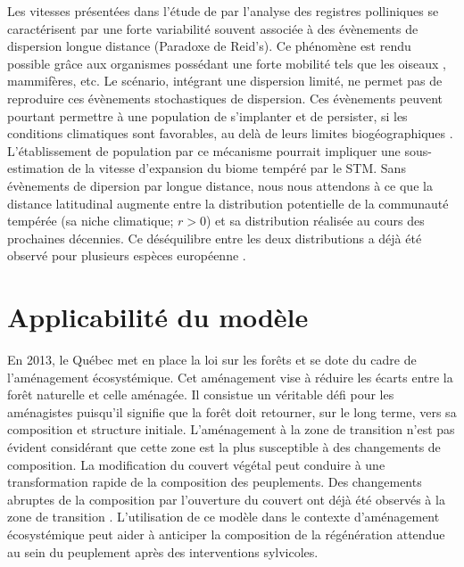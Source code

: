 Les vitesses présentées dans l'étude de \citet{Davis1981} par l'analyse des registres polliniques se
caractérisent par une forte variabilité souvent associée à des évènements de dispersion longue
distance (Paradoxe de Reid's). Ce phénomène est rendu possible grâce aux organismes possédant une
forte mobilité tels que les oiseaux \citep{Clark1998}, mammifères, etc. Le scénario, intégrant une
dispersion limité, ne permet pas de reproduire ces évènements stochastiques de dispersion. Ces
évènements peuvent pourtant permettre à une population de s'implanter et de persister, si les
conditions climatiques sont favorables, au delà de leurs limites biogéographiques
\citep{Clark1998,Corlett2013}. L'établissement de population par ce mécanisme pourrait impliquer une
sous-estimation de la vitesse d'expansion du biome tempéré par le STM.  Sans évènements de dipersion
par longue distance, nous nous attendons à ce que la distance latitudinal augmente entre la
distribution potentielle de la communauté tempérée (sa niche climatique; $r>0$) et sa distribution
réalisée au cours des prochaines décennies. Ce déséquilibre entre les deux distributions a déjà été
observé pour plusieurs espèces européenne \citep{Svenning2004}.

\section*{Applicabilité du modèle}

En 2013, le Québec met en place la loi sur les forêts et se dote du cadre de l'aménagement
écosystémique. Cet aménagement vise à réduire les écarts entre la forêt naturelle et celle aménagée.
Il consistue un véritable défi pour les aménagistes puisqu'il signifie que la forêt doit retourner,
sur le long terme, vers sa composition et structure initiale. L'aménagement à la zone de transition
n'est pas évident considérant que cette zone est la plus susceptible à des changements de
composition.  La modification du couvert végétal peut conduire à une transformation rapide de la
composition des peuplements. Des changements abruptes de la composition par l'ouverture du couvert
ont déjà été observés à la zone de transition \cite{Dupuis2011,Boucher2006}. L'utilisation de ce
modèle dans le contexte d'aménagement écosystémique peut aider à anticiper la composition de la
régénération attendue au sein du peuplement après des interventions sylvicoles.

